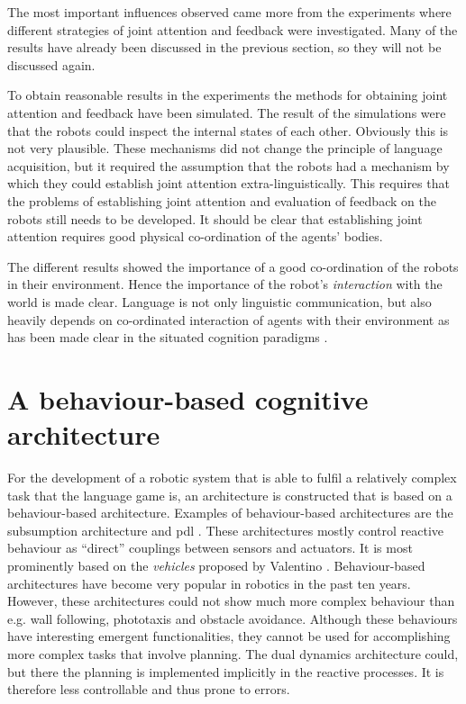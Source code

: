 The most important influences observed came more from the experiments where different strategies of joint attention and feedback were investigated. Many of the results have already been discussed in the previous section, so they will not be discussed again.  

To obtain reasonable results in the experiments the methods for obtaining joint attention and feedback have been simulated. The result of the simulations were that the robots could inspect the internal states of each other. Obviously this is not very plausible. These mechanisms did not change the principle of language acquisition, but it required the assumption that the robots had a mechanism by which they could establish joint attention extra-linguistically. This requires that the problems of establishing joint attention and evaluation of feedback on the robots still needs to be developed. It should be clear that establishing joint attention requires good physical co-ordination of the agents' bodies.


The different results showed the importance of a good co-ordination of the robots in their environment. Hence the importance of the robot's {\em interaction} with the world is made clear. Language is not only linguistic communication, but also heavily depends on co-ordinated interaction of agents with their environment as has been made clear in the situated cognition paradigms \citep{clancey:1997}.

\section{A behaviour-based cognitive architecture}

For the development of a robotic system that is able to fulfil a relatively complex task that the language game is, an architecture is constructed that is based on a behaviour-based architecture. Examples of behaviour-based architectures are the subsumption architecture \citep{brooks:1990} and {\sc pdl} \citep{steels:1994b}. These architectures mostly control reactive behaviour as ``direct'' couplings between sensors and actuators. It is most prominently based on the {\em vehicles} proposed by Valentino \citet{braitenberg:1984}. Behaviour-based architectures have become very popular in robotics in the past ten years. However, these architectures could not show much more complex behaviour than e.g. wall following, phototaxis and obstacle avoidance. Although these behaviours have interesting emergent functionalities, they cannot be used for accomplishing more complex tasks that involve planning. The dual dynamics architecture \citep{jaeger:1997} could, but there the planning is implemented implicitly in the reactive processes. It is therefore less controllable and thus prone to errors.


